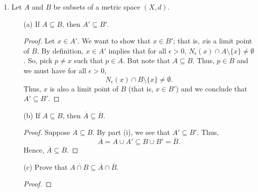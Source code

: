\documentclass[a4paper]{article}
\begin{document}
\begin{enumerate}
\begin{proof}
    Finally, suppose \( x  \) and \( y  \) are limit points of \( E  \). By definition, for all \( \epsilon > 0  \) and \( \delta > 0  \), we have
    \begin{align*}
     (x - \epsilon, x + \epsilon) \cap E \setminus  \{ x  \} &\neq \emptyset \\
     (y - \delta, y  + \delta) \cap E \setminus  \{ y \} &\neq \emptyset. 
    \end{align*}
    Without loss of generality, let \( \epsilon = \delta > 0 \) and pick \( p \neq x  \in E  \) such that \( p \in (x- \epsilon , x + \epsilon) \). Since \( x < y  \), we have that  
    \[  x - \epsilon < p < x + \epsilon < y + \epsilon. \]
    Thus, we see that 
    \[  x < p < y. \]
    \end{proof}
    \item Let \( A  \) and \( B  \) be subsets of a metric space \( (X,d) \).
        \begin{enumerate}
            \item[(a)] If \( A \subseteq B  \), then \( A' \subseteq B' \).
                \begin{proof}
                Let \( x \in A' \). We want to show that \( x \in B' \); that is, \( x  \)is a limit point of \( B  \). By definition, \( x \in A'  \) implies that for all \( \epsilon > 0  \), \( {N}_{\epsilon}(x) \cap A \setminus  \{ x \} \neq \emptyset \). So, pick \( p \neq x  \) such that \( p \in A  \). But note that \( A \subseteq B  \). Thus, \( p \in  B \) and we must have for all \( \epsilon > 0 \), 
                \[  {N}_{\epsilon}(x) \cap B \setminus  \{ x \} \neq \emptyset. \]
                Thus, \( x  \) is also a limit point of \( B  \) (that is, \( x \in B' \)) and we conclude that \( A' \subseteq  B' \).
                \end{proof}
            \item[(b)] If \( A \subseteq  B  \), then \( \overline{A} \subseteq \overline{B} \).
                \begin{proof}
                Suppose \( A \subseteq  B  \). By part (i), we see that \( A' \subseteq  B ' \). Thus, 
                \[  \overline{A} = A \cup A' \subseteq  B \cup B' = \overline{B}. \]
                Hence, \( \overline{A} \subseteq \overline{B} \).
                \end{proof}
            \item[(c)] Prove that \( \overline{A \cap B} \subseteq \overline{A} \cap \overline{B} \).
                \begin{proof}

\end{proof}
\end{enumerate}
\end{enumerate}
\end{document}
